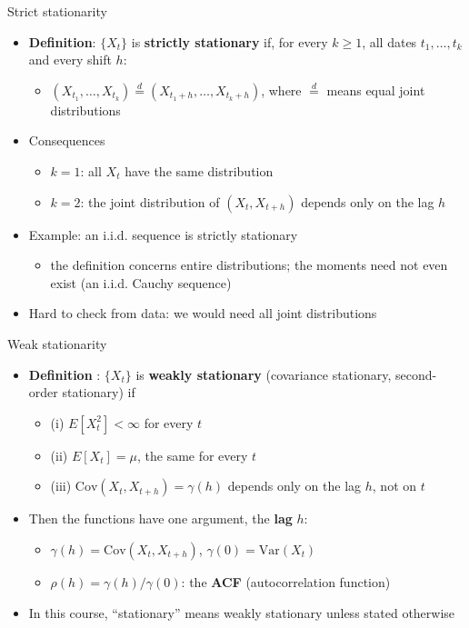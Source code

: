 \begin{frame}{Strict stationarity}
\itemsize{\small}
\begin{itemize}
    \item \textbf{Definition}: $\{X_t\}$ is \textbf{strictly stationary} if, for every $k \ge 1$, all dates $t_1, \dots, t_k$ and every shift $h$:
    \begin{itemize}
        \item $(X_{t_1}, \dots, X_{t_k}) \overset{d}{=} (X_{t_1 + h}, \dots, X_{t_k + h})$, where $\overset{d}{=}$ means equal joint distributions
    \end{itemize}
    \item Consequences
    \begin{itemize}
        \item $k = 1$: all $X_t$ have the same distribution
        \item $k = 2$: the joint distribution of $(X_t, X_{t+h})$ depends only on the lag $h$
    \end{itemize}
    \item Example: an i.i.d. sequence is strictly stationary
    \begin{itemize}
        \item the definition concerns entire distributions; the moments need not even exist (an i.i.d. Cauchy sequence)
    \end{itemize}
    \item Hard to check from data: we would need all joint distributions
\end{itemize}
\end{frame}

\begin{frame}{Weak stationarity}
\itemsize{\small}
\begin{itemize}
    \item \textbf{Definition} : $\{X_t\}$ is \textbf{weakly stationary} (covariance stationary, second-order stationary) if
    \begin{itemize}
        \item (i) $E[X_t^2] < \infty$ for every $t$
        \item (ii) $E[X_t] = \mu$, the same for every $t$
        \item (iii) $\mathrm{Cov}(X_t, X_{t+h}) = \gamma(h)$ depends only on the lag $h$, not on $t$
    \end{itemize}
    \item Then the functions have one argument, the \textbf{lag} $h$:
    \begin{itemize}
        \item $\gamma(h) = \mathrm{Cov}(X_t, X_{t+h})$, $\gamma(0) = \mathrm{Var}(X_t)$
        \item $\rho(h) = \gamma(h)/\gamma(0)$: the \textbf{ACF} (autocorrelation function)
    \end{itemize}
    \item In this course, ``stationary'' means weakly stationary unless stated otherwise
\end{itemize}
\end{frame}

